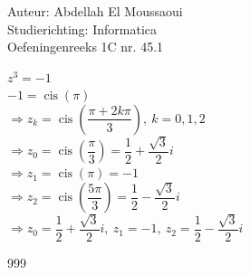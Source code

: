 \documentclass[a4paper]{article}
\begin{document}
  
\noindent \large Auteur: Abdellah El Moussaoui \\
\noindent \large Studierichting: Informatica\\
\noindent \large Oefeningenreeks 1C nr. 45.1\\

\medskip

\normalsize

\medskip

$z^3=-1$\\

$-1=\operatorname{cis}(\pi)$\\

$\Rightarrow z_k=\operatorname{cis}\left(\dfrac{\pi+2k\pi}{3}\right),\ k=0,1,2$\\

$\Rightarrow z_0=\operatorname{cis}\left(\dfrac{\pi}{3}\right)=\dfrac12+\dfrac{\sqrt3}{2}i$\\

$\Rightarrow z_1=\operatorname{cis}(\pi)=-1$\\

$\Rightarrow z_2=\operatorname{cis}\left(\dfrac{5\pi}{3}\right)=\dfrac12-\dfrac{\sqrt3}{2}i$\\

$\Rightarrow \boxed{z_0=\dfrac12+\dfrac{\sqrt3}{2}i,\ z_1=-1,\ z_2=\dfrac12-\dfrac{\sqrt3}{2}i}$\\

\begin{thebibliography}{999}
\end{thebibliography}
\end{document}
